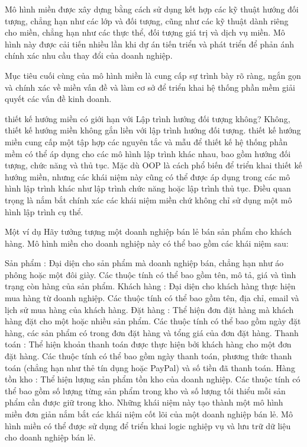 Mô hình miền được xây dựng bằng cách sử dụng kết hợp các kỹ thuật hướng đối tượng, chẳng hạn như các lớp và đối tượng, cũng như các kỹ thuật dành riêng cho miền, chẳng hạn như các thực thể, đối tượng giá trị và dịch vụ miền. Mô hình này được cải tiến nhiều lần khi dự án tiến triển và phát triển để phản ánh chính xác nhu cầu thay đổi của doanh nghiệp.

Mục tiêu cuối cùng của mô hình miền là cung cấp sự trình bày rõ ràng, ngắn gọn và chính xác về miền vấn đề và làm cơ sở để triển khai hệ thống phần mềm giải quyết các vấn đề kinh doanh.

thiết kế hướng miền có giới hạn với Lập trình hướng đối tượng không?
Không, thiết kế hướng miền không gắn liền với lập trình hướng đối tượng. thiết kế hướng miền cung cấp một tập hợp các nguyên tắc và mẫu để thiết kế hệ thống phần mềm có thể áp dụng cho các mô hình lập trình khác nhau, bao gồm hướng đối tượng, chức năng và thủ tục. Mặc dù OOP là cách phổ biến để triển khai thiết kế hướng miền, nhưng các khái niệm này cũng có thể được áp dụng trong các mô hình lập trình khác như lập trình chức năng hoặc lập trình thủ tục. Điều quan trọng là nắm bắt chính xác các khái niệm miền chứ không chỉ sử dụng một mô hình lập trình cụ thể.

Một ví dụ
Hãy tưởng tượng một doanh nghiệp bán lẻ bán sản phẩm cho khách hàng. Mô hình miền cho doanh nghiệp này có thể bao gồm các khái niệm sau:

Sản phẩm : Đại diện cho sản phẩm mà doanh nghiệp bán, chẳng hạn như áo phông hoặc một đôi giày. Các thuộc tính có thể bao gồm tên, mô tả, giá và tình trạng còn hàng của sản phẩm.
Khách hàng : Đại diện cho khách hàng thực hiện mua hàng từ doanh nghiệp. Các thuộc tính có thể bao gồm tên, địa chỉ, email và lịch sử mua hàng của khách hàng.
Đặt hàng : Thể hiện đơn đặt hàng mà khách hàng đặt cho một hoặc nhiều sản phẩm. Các thuộc tính có thể bao gồm ngày đặt hàng, các sản phẩm có trong đơn đặt hàng và tổng giá của đơn đặt hàng.
Thanh toán : Thể hiện khoản thanh toán được thực hiện bởi khách hàng cho một đơn đặt hàng. Các thuộc tính có thể bao gồm ngày thanh toán, phương thức thanh toán (chẳng hạn như thẻ tín dụng hoặc PayPal) và số tiền đã thanh toán.
Hàng tồn kho : Thể hiện lượng sản phẩm tồn kho của doanh nghiệp. Các thuộc tính có thể bao gồm số lượng từng sản phẩm trong kho và số lượng tối thiểu mỗi sản phẩm cần được giữ trong kho.
Những khái niệm này tạo thành một mô hình miền đơn giản nắm bắt các khái niệm cốt lõi của một doanh nghiệp bán lẻ. Mô hình miền có thể được sử dụng để triển khai logic nghiệp vụ và lưu trữ dữ liệu cho doanh nghiệp bán lẻ.

